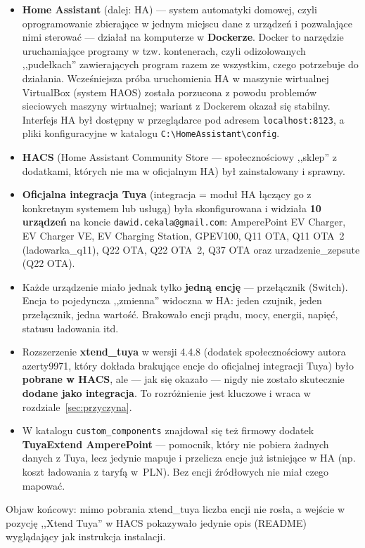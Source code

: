\documentclass[11pt,a4paper]{article}
\begin{document}
\begin{itemize}
\item \textbf{Home Assistant} (dalej: HA) --- system automatyki domowej, czyli oprogramowanie zbierające w jednym miejscu dane z urządzeń i pozwalające nimi sterować --- działał na komputerze w \textbf{Dockerze}. Docker to narzędzie uruchamiające programy w tzw. kontenerach, czyli odizolowanych ,,pudełkach'' zawierających program razem ze wszystkim, czego potrzebuje do działania. Wcześniejsza próba uruchomienia HA w maszynie wirtualnej VirtualBox (system HAOS) została porzucona z powodu problemów sieciowych maszyny wirtualnej; wariant z Dockerem okazał się stabilny. Interfejs HA był dostępny w przeglądarce pod adresem \texttt{localhost:8123}, a pliki konfiguracyjne w katalogu \texttt{C:\textbackslash HomeAssistant\textbackslash config}.
\item \textbf{HACS} (Home Assistant Community Store --- społecznościowy ,,sklep'' z dodatkami, których nie ma w oficjalnym HA) był zainstalowany i sprawny.
\item \textbf{Oficjalna integracja Tuya} (integracja = moduł HA łączący go z konkretnym systemem lub usługą) była skonfigurowana i widziała \textbf{10 urządzeń} na koncie \texttt{dawid.cekala@gmail.com}: AmperePoint EV Charger, EV Charger VE, EV Charging Station, GPEV100, Q11 OTA, Q11 OTA~2 (ladowarka\_q11), Q22 OTA, Q22 OTA~2, Q37 OTA oraz urzadzenie\_zepsute (Q22 OTA).
\item Każde urządzenie miało jednak tylko \textbf{jedną encję} --- przełącznik (Switch). Encja to pojedyncza ,,zmienna'' widoczna w HA: jeden czujnik, jeden przełącznik, jedna wartość. Brakowało encji prądu, mocy, energii, napięć, statusu ładowania itd.
\item Rozszerzenie \textbf{xtend\_tuya} w wersji 4.4.8 (dodatek społecznościowy autora azerty9971, który dokłada brakujące encje do oficjalnej integracji Tuya) było \textbf{pobrane w HACS}, ale --- jak się okazało --- nigdy nie zostało skutecznie \textbf{dodane jako integracja}. To rozróżnienie jest kluczowe i wraca w rozdziale~\ref{sec:przyczyna}.
\item W katalogu \texttt{custom\_components} znajdował się też firmowy dodatek \textbf{TuyaExtend AmperePoint} --- pomocnik, który nie pobiera żadnych danych z Tuya, lecz jedynie mapuje i przelicza encje już istniejące w HA (np. koszt ładowania z taryfą w~PLN). Bez encji źródłowych nie miał czego mapować.
\end{itemize}

Objaw końcowy: mimo pobrania xtend\_tuya liczba encji nie rosła, a wejście w pozycję ,,Xtend Tuya'' w HACS pokazywało jedynie opis (README) wyglądający jak instrukcja instalacji.
\end{document}
